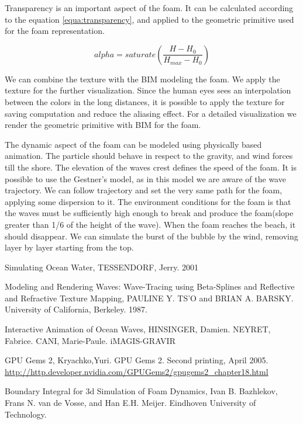 \documentclass{article}
\begin{document}
Transparency is an important aspect of the foam. It can be calculated\cite{nvidia} according to the equation
\ref{equa:transparency}, and applied to the geometric
primitive used for the foam representation.

\begin{equation} alpha=saturate(\frac{H-H_0}{H_{max} - H_0})
  \label{equa:transparency} \end{equation}

We can combine the texture with the BIM modeling the foam. We apply
the texture for the further visualization. Since the human eyes sees an interpolation
between the colors in the long distances, it is possible to apply the
texture for saving computation and reduce the aliasing effect.  For a
detailed visualization we render the geometric primitive with
BIM for the foam.

The dynamic aspect of the foam can be modeled using physically based animation. The particle should behave in respect to the gravity, and wind forces till the shore. The elevation of the waves crest defines the speed of the foam. It is possible to use the Gestner's model, as in this model we are aware of the wave trajectory. We can follow trajectory and set the very same path for the foam, applying some dispersion to it\cite{iaow}.
The environment conditions for the foam is that the waves must be sufficiently high enough to break and produce the foam(slope greater than 1/6 \cite{sow} of the height of the wave).
When the foam reaches the beach, it should disappear. We can simulate the burst of the bubble by the wind, removing layer by layer starting from the top.


\begin{thebibliography}{9}

    Simulating Ocean Water,
    TESSENDORF, Jerry.
    2001

    Modeling and Rendering Waves: Wave-Tracing using Beta-Splines and Reflective and Refractive Texture Mapping,
    PAULINE Y. TS'O and BRIAN A. BARSKY.
    University of California, Berkeley.
    1987.

    Interactive Animation of Ocean Waves,
    HINSINGER, Damien. NEYRET, Fabrice. CANI, Marie-Paule.
    iMAGIS-GRAVIR

    GPU Gems 2,
    Kryachko,Yuri.
    GPU Gems 2. 
    Second printing, April 2005.
    \url{http://http.developer.nvidia.com/GPUGems2/gpugems2_chapter18.html}

    Boundary Integral for 3d Simulation of Foam Dynamics,
    Ivan B. Bazhlekov, Frans N. van de Vosse, and Han E.H. Meijer.
    Eindhoven University of Technology.

\end{thebibliography}
\end{document}
